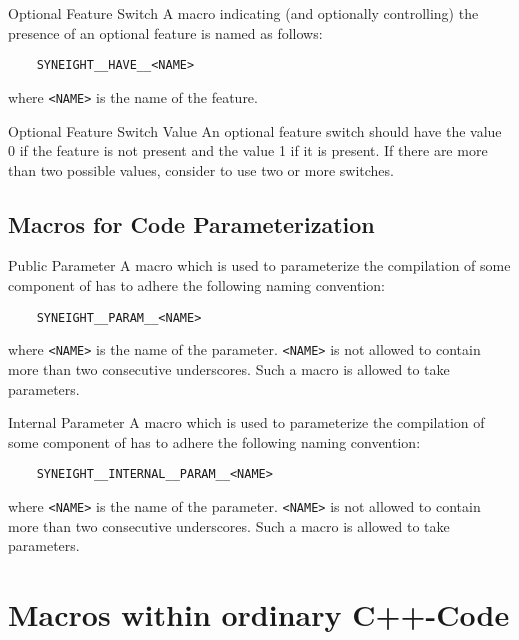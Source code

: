 \begin{rule*}{Optional Feature Switch}
  A macro indicating (and optionally controlling) the presence of an
  optional feature is named as follows:
  \begin{verbatim}
    SYNEIGHT__HAVE__<NAME>
  \end{verbatim}
  where {\tt <NAME>} is the name of the feature. 
\end{rule*}
%
\begin{guideline*}{Optional Feature Switch Value}
  An optional feature switch should have the value 0 if the feature is
  not present and the value 1 if it is present. 
  If there are more than two possible values, consider to use two or
  more switches.
\end{guideline*}




\subsection{Macros for Code Parameterization}
\label{sec:macros-for-code-parameterization}


\begin{rule*}{Public Parameter}
  \label{def:public-parameter}
  A macro which is used to parameterize the compilation of some
  component of \SYNEIGHT has to adhere the following naming convention:
  \begin{verbatim} 
    SYNEIGHT__PARAM__<NAME>
  \end{verbatim}
  where {\tt <NAME>} is the name of the parameter. {\tt <NAME>} is not
  allowed to contain more than two consecutive underscores.  Such a
  macro is allowed to take parameters.
\end{rule*}


\begin{rule*}{Internal Parameter}
  A macro which is used to parameterize the compilation of some
  component of \SYNEIGHT has to adhere the following naming convention:
  \begin{verbatim} 
    SYNEIGHT__INTERNAL__PARAM__<NAME>
  \end{verbatim}
  where {\tt <NAME>} is the name of the parameter. {\tt <NAME>} is not
  allowed to contain more than two consecutive underscores.  Such a
  macro is allowed to take parameters.
\end{rule*}



\section{Macros within ordinary C++-Code}
\label{sec:macr-within-ordinary-cpp-code}

